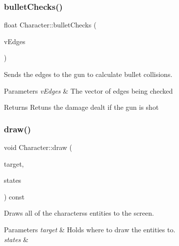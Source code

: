 \subsubsection{\texorpdfstring{bullet\+Checks()}{bulletChecks()}}
{\footnotesize\ttfamily float Character\+::bullet\+Checks (\begin{DoxyParamCaption}\item[{std\+::vector$<$ sf\+::\+Vector2f $>$}]{v\+Edges }\end{DoxyParamCaption})}



Sends the edges to the gun to calculate bullet collisions. 


\begin{DoxyParams}{Parameters}
{\em v\+Edges} & The vector of edges being checked \\
\hline
\end{DoxyParams}
\begin{DoxyReturn}{Returns}
Retuns the damage dealt if the gun is shot 
\end{DoxyReturn}
\mbox{\label{class_character_a3812c72bf1cf8090f67a3387b5d96753}} 
\subsubsection{\texorpdfstring{draw()}{draw()}}
{\footnotesize\ttfamily void Character\+::draw (\begin{DoxyParamCaption}\item[{sf\+::\+Render\+Target \&}]{target,  }\item[{sf\+::\+Render\+States}]{states }\end{DoxyParamCaption}) const\hspace{0.3cm}{\ttfamily [private]}}



Draws all of the characters\textquotesingle{}s entities to the screen. 


\begin{DoxyParams}{Parameters}
{\em target} & Holds where to draw the entities to. \\
\hline
{\em states} & \\
\hline
\end{DoxyParams}
\mbox{\label{class_character_aaa04388699d1b6cb0a48e1daed8eb63a}} 
